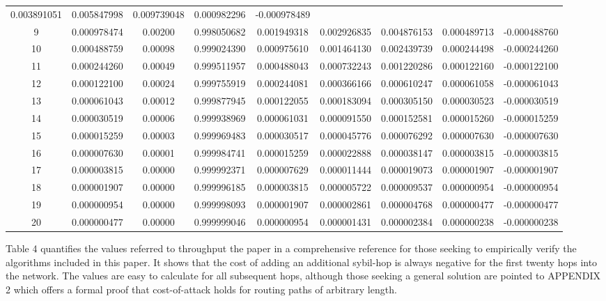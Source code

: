\documentclass[oneside]{article}   	%
\begin{document}
\begin{center}
\begin{tabular}{ |c|c|c|c|c|c|c|c|c| }
0.003891051 & 
0.005847998 & 
0.009739048 & 
0.000982296 & 
-0.000978489 \\
9 & 
0.000978474 & 
0.00200 & 
0.998050682 & 
0.001949318 & 
0.002926835 & 
0.004876153 & 
0.000489713 & 
-0.000488760 \\
10 & 
0.000488759 &
0.00098 & 
0.999024390 & 
0.000975610 & 
0.001464130 & 
0.002439739 & 
0.000244498 & 
-0.000244260 \\
11 & 
0.000244260 & 
0.00049 & 
0.999511957 & 
0.000488043 & 
0.000732243 & 
0.001220286 & 
0.000122160 & 
-0.000122100 \\
12 & 
0.000122100 & 
0.00024 & 
0.999755919 & 
0.000244081 & 
0.000366166 & 
0.000610247 & 
0.000061058 & 
-0.000061043 \\
13 & 
0.000061043 &
0.00012 & 
0.999877945 & 
0.000122055 & 
0.000183094 & 
0.000305150 & 
0.000030523 & 
-0.000030519 \\
14 & 
0.000030519 & 
0.00006 & 
0.999938969 & 
0.000061031 & 
0.000091550 & 
0.000152581 & 
0.000015260 & 
-0.000015259 \\
15 & 
0.000015259 & 
0.00003 & 
0.999969483 & 
0.000030517 & 
0.000045776 & 
0.000076292 & 
0.000007630 & 
-0.000007630 \\
16 & 
0.000007630 & 
0.00001 & 
0.999984741 & 
0.000015259 & 
0.000022888 & 
0.000038147 & 
0.000003815 & 
-0.000003815 \\
17 & 
0.000003815 & 
0.00000 & 
0.999992371 & 
0.000007629 & 
0.000011444 & 
0.000019073 & 
0.000001907 & 
-0.000001907 \\
18 & 
0.000001907 & 
0.00000 & 
0.999996185 & 
0.000003815 & 
0.000005722 & 
0.000009537 & 
0.000000954 & 
-0.000000954 \\
19 & 
0.000000954 & 
0.00000 &
0.999998093 & 
0.000001907 & 
0.000002861 & 
0.000004768 & 
0.000000477 & 
-0.000000477 \\
20 & 
0.000000477 & 
0.00000 & 
0.999999046 & 
0.000000954 & 
0.000001431 & 
0.000002384 & 
0.000000238 & 
-0.000000238 \\
 \hline
\end{tabular}

\bigskip

Table 4 quantifies the values referred to throughput the paper in a comprehensive reference for those seeking to empirically verify the algorithms included in this paper. It shows that the cost of adding an additional sybil-hop is always negative for the first twenty hops into the network. The values are easy to calculate for all subsequent hops, although those seeking a general solution are pointed to APPENDIX 2 which offers a formal proof that cost-of-attack holds for routing paths of arbitrary length.
\end{center}
\end{document}
